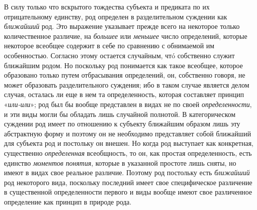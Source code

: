 \documentclass[twoside]{article}
\begin{document}
{{В силу только что вскрытого тождества субъекта и предиката по
их отрицательному единству, род определен в разделительном суждении как
{\em ближайший} род. Это
выражение указывает прежде всего на некоторое только количественное
различие, на {\em большее}
или {\em меньшее}
число определений, которые некоторое всеобщее содержит в себе
по сравнению с обнимаемой им особенностью. Согласно этому остается
случайным, чтó собственно служит ближайшим родом. Но поскольку род
понимается как такое всеобщее, которое образовано только путем отбрасывания
определений, он, собственно говоря, не может образовать разделительного
суждения; ибо в таком случае является делом случая, осталась ли еще в нем
та определенность, которая составляет принцип
«{\em или-или}»; род был
бы вообще представлен в видах не по своей
{\em определенности}, и
эти виды могли бы обладать лишь случайной полнотой. В категорическом
суждении род имеет по отношению к субъекту ближайшим образом лишь эту
абстрактную форму и поэтому он не необходимо представляет собой ближайший
для субъекта род и постольку он внешен. Но когда род выступает как
конкретная, существенно
{\em определенная}
всеобщность, то он, как простая определенность, есть единство
{\em моментов понятия},
которые в указанной простоте лишь сняты, но
имеют в видах свое реальное различие. Поэтому род постольку есть
{\em ближайший} род
некоторого вида, поскольку последний имеет свое специфическое различение в
существенной определенности первого и виды вообще имеют свое различенное
определение как принцип в природе рода.

}}
\end{document}
